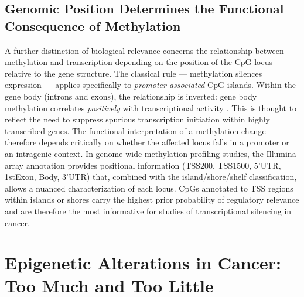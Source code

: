 \subsection{Genomic Position Determines the Functional Consequence of Methylation}

A further distinction of biological relevance concerns the relationship between
methylation and transcription depending on the position of the CpG locus relative
to the gene structure. The classical rule — methylation silences expression — applies
specifically to \textit{promoter-associated} CpG islands. Within the gene body
(introns and exons), the relationship is inverted: gene body methylation correlates
\textit{positively} with transcriptional activity \cite{Jones2012}. This is thought
to reflect the need to suppress spurious transcription initiation within highly
transcribed genes. The functional interpretation of a methylation change therefore
depends critically on whether the affected locus falls in a promoter or an
intragenic context.
In genome-wide methylation profiling studies, the Illumina array annotation
provides positional information (TSS200, TSS1500, 5'UTR, 1stExon, Body, 3'UTR)
that, combined with the island/shore/shelf classification, allows a nuanced
characterization of each locus. CpGs annotated to TSS regions within islands or
shores carry the highest prior probability of regulatory relevance and are therefore
the most informative for studies of transcriptional silencing in cancer.

\section{Epigenetic Alterations in Cancer: Too Much and Too Little}

